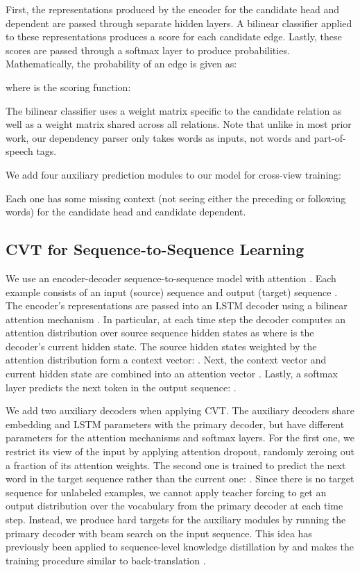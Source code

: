 \documentclass[11pt,a4paper]{article}
\newcommand{\alns}[1] {
	
}
\newcommand{\relu} {\text{ReLU}}
\newcommand{\mlph}[1] { \relu(W_{\text{head}}#1 + b_{\text{head}}) }
\newcommand{\mlpd}[1] { \relu(W_{\text{dep}}#1 + b_{\text{dep}}) }
\begin{document}
First, the representations produced by the encoder for the candidate head and dependent are passed through separate hidden layers. A bilinear classifier applied to these representations produces a score for each candidate edge. Lastly, these scores are passed through a softmax layer to produce probabilities. Mathematically, the probability of an edge is given as:

where  is the scoring function: 
\alns{
s(z_1, z_2, r) = \phantom{.}&\mlph{z_1}(W_r + W) \\ &\mlpd{z_2}
}
The bilinear classifier uses a weight matrix  specific to the candidate relation as well as a weight matrix  shared across all relations. Note that unlike in most prior work, our dependency parser only takes words as inputs, not words and part-of-speech tags.

We add four auxiliary prediction modules to our model for cross-view training:

Each one has some missing context (not seeing either the preceding or following words) for the candidate head and candidate dependent. 

\subsection{CVT for Sequence-to-Sequence Learning}
\label{sec:seq2seq}
We use an encoder-decoder sequence-to-sequence model with attention \citep{sutskever2014sequence,bahdanau2014neural}. Each example consists of an input (source) sequence  and output (target) sequence  . The encoder's representations are passed into an LSTM decoder using a bilinear attention mechanism \citep{Luong2015EffectiveAT}. In particular, at each time step  the decoder computes an attention distribution over source sequence hidden states as  where  is the decoder's current hidden state. The source hidden states weighted by the attention distribution form a context vector: . Next, the context vector and current hidden state are combined into an attention vector . Lastly, a softmax layer predicts the next token in the output sequence: .

We add two auxiliary decoders when applying CVT. The auxiliary decoders share embedding and LSTM parameters with the primary decoder, but have different parameters for the attention mechanisms and softmax layers. For the first one, we restrict its view of the input by applying attention dropout, randomly zeroing out a fraction of its attention weights. The second one is trained to predict the next word in the target sequence rather than the current one:
. 
Since there is no target sequence for unlabeled examples, we cannot apply teacher forcing to get an output distribution over the vocabulary from the primary decoder at each time step. Instead, we produce hard targets for the auxiliary modules by running the primary decoder with beam search on the input sequence. This idea has previously been applied to sequence-level knowledge distillation by \citet{Kim2016SequenceLevelKD} and makes the training procedure similar to back-translation \citep{Sennrich2016ImprovingNM}.
\end{document}
